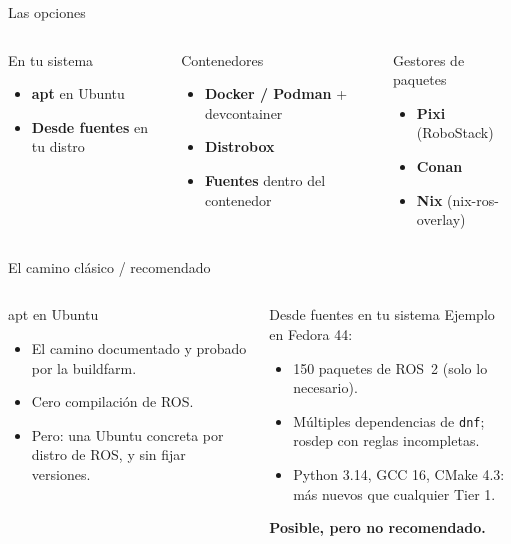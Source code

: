 \documentclass[aspectratio=169]{beamer}
\begin{document}
\begin{frame}{Las opciones}
\begin{columns}[T]
\begin{block}{En tu sistema}
\begin{itemize}
  \item \textbf{apt} en Ubuntu
  \item \textbf{Desde fuentes} en tu distro
\end{itemize}
\end{block}
\begin{block}{Contenedores}
\begin{itemize}
  \item \textbf{Docker / Podman} + devcontainer
  \item \textbf{Distrobox}
  \item \textbf{Fuentes} dentro del contenedor
\end{itemize}
\end{block}
\begin{block}{Gestores de paquetes}
\begin{itemize}
  \item \textbf{Pixi} (RoboStack)
  \item \textbf{Conan}
  \item \textbf{Nix} (nix-ros-overlay)
\end{itemize}
\end{block}
\end{columns}
\end{frame}

\begin{frame}{El camino clásico / recomendado}
\begin{columns}[T]
\begin{block}{apt en Ubuntu}
\begin{itemize}
  \item El camino documentado y probado por la buildfarm.
  \item Cero compilación de ROS.
  \item Pero: una Ubuntu concreta por distro de ROS, y sin fijar versiones.
\end{itemize}
\end{block}
\begin{alertblock}{Desde fuentes en tu sistema}
Ejemplo en Fedora 44:
\begin{itemize}
  \item 150 paquetes de ROS~2 (solo lo necesario).
  \item Múltiples dependencias de \texttt{dnf}; rosdep con reglas incompletas.
  \item Python 3.14, GCC 16, CMake 4.3: más nuevos que cualquier Tier 1.
\end{itemize}
\textbf{Posible, pero no recomendado.}
\end{alertblock}
\end{columns}
\end{frame}
\end{document}
